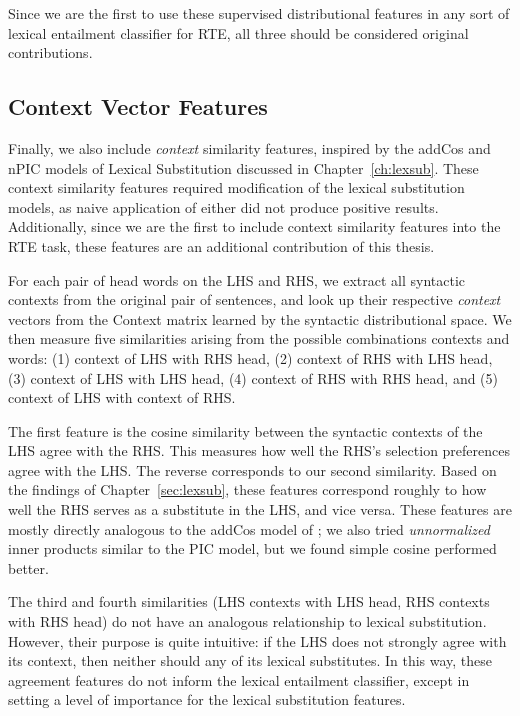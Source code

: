 Since we are the first to use these supervised distributional features in any
sort of lexical entailment classifier for RTE, all three should be considered
original contributions.

\subsection{Context Vector Features}

Finally, we also include {\em context} similarity features, inspired by the
addCos \cite{melamud:2015:vsm} and nPIC \cite{roller:2016:naacl} models of
Lexical Substitution discussed in Chapter~\ref{ch:lexsub}. These context
similarity features required modification of the lexical substitution models,
as naive application of either did not produce positive results. Additionally,
since we are the first to include context similarity features into the RTE
task, these features are an additional contribution of this thesis.

For each pair of head words on the LHS and RHS, we extract all syntactic
contexts from the original pair of sentences, and look up their respective {\em
context} vectors from the Context matrix learned by the syntactic
distributional space. We then measure five similarities arising
from the possible combinations contexts and words:
(1) context of LHS with RHS head, (2) context of RHS with LHS head,
(3) context of LHS with LHS head, (4) context of RHS with RHS head, and
(5) context of LHS with context of RHS.

The first feature is the cosine similarity between the syntactic contexts of
the LHS agree with the RHS. This measures how well the RHS's selection
preferences agree with the LHS. The reverse corresponds to our
second similarity. Based on the findings of Chapter~\ref{sec:lexsub}, these
features correspond roughly to how well the RHS serves as a substitute in
the LHS, and vice versa. These features are mostly directly analogous to the
addCos model of ; we also tried {\em unnormalized}
inner products similar to the PIC model, but we found simple cosine performed
better.

The third and fourth similarities (LHS contexts with LHS head, RHS contexts
with RHS head) do not have an analogous relationship to lexical substitution.
However, their purpose is quite intuitive: if the LHS does not strongly agree
with its context, then neither should any of its lexical substitutes. In this
way, these agreement features do not inform the lexical entailment
classifier, except in setting a level of importance for the lexical substitution
features.

